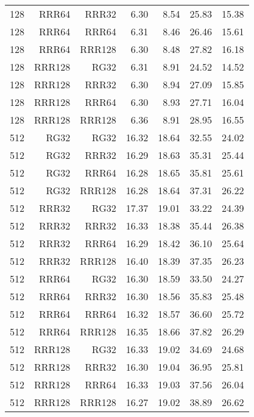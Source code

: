 \begin{table}
\begin{tabular}{|r|r|r|r|r|r|r|}
128 & RRR64 & RRR32 & 6.30 & 8.54 & 25.83 & 15.38 \\
128 & RRR64 & RRR64 & 6.31 & 8.46 & 26.46 & 15.61 \\
128 & RRR64 & RRR128 & 6.30 & 8.48 & 27.82 & 16.18 \\
128 & RRR128 & RG32 & 6.31 & 8.91 & 24.52 & 14.52 \\
128 & RRR128 & RRR32 & 6.30 & 8.94 & 27.09 & 15.85 \\
128 & RRR128 & RRR64 & 6.30 & 8.93 & 27.71 & 16.04 \\
128 & RRR128 & RRR128 & 6.36 & 8.91 & 28.95 & 16.55 \\
512 & RG32 & RG32 & 16.32 & 18.64 & 32.55 & 24.02 \\
512 & RG32 & RRR32 & 16.29 & 18.63 & 35.31 & 25.44 \\
512 & RG32 & RRR64 & 16.28 & 18.65 & 35.81 & 25.61 \\
512 & RG32 & RRR128 & 16.28 & 18.64 & 37.31 & 26.22 \\
512 & RRR32 & RG32 & 17.37 & 19.01 & 33.22 & 24.39 \\
512 & RRR32 & RRR32 & 16.33 & 18.38 & 35.44 & 26.38 \\
512 & RRR32 & RRR64 & 16.29 & 18.42 & 36.10 & 25.64 \\
512 & RRR32 & RRR128 & 16.40 & 18.39 & 37.35 & 26.23 \\
512 & RRR64 & RG32 & 16.30 & 18.59 & 33.50 & 24.27 \\
512 & RRR64 & RRR32 & 16.30 & 18.56 & 35.83 & 25.48 \\
512 & RRR64 & RRR64 & 16.32 & 18.57 & 36.60 & 25.72 \\
512 & RRR64 & RRR128 & 16.35 & 18.66 & 37.82 & 26.29 \\
512 & RRR128 & RG32 & 16.33 & 19.02 & 34.69 & 24.68 \\
512 & RRR128 & RRR32 & 16.30 & 19.04 & 36.95 & 25.81 \\
512 & RRR128 & RRR64 & 16.33 & 19.03 & 37.56 & 26.04 \\
512 & RRR128 & RRR128 & 16.27 & 19.02 & 38.89 & 26.62 \\
\hline
\end{tabular}
\end{table}


